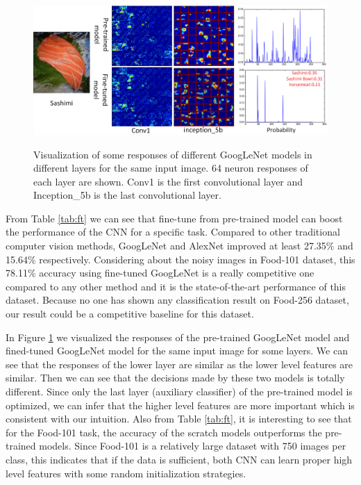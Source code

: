 \begin{figure}[htbp]
  \centering
  \includegraphics[scale=0.5]{fig/sashimi.png}\\
  \caption{Visualization of some responses of different GoogLeNet models in different layers for the same input image. 64 neuron responses of each layer are shown. Conv1 is the first convolutional layer and Inception\_5b is the last convolutional layer. }
   \label{fig:sashimi}
\end{figure}
From Table \ref{tab:ft} we can see that fine-tune from pre-trained model can boost the performance of the CNN for a specific task. Compared to other traditional computer vision methods, GoogLeNet and AlexNet improved at least 27.35\% and 15.64\% respectively. Considering about the noisy images in Food-101 dataset, this 78.11\% accuracy using fine-tuned GoogLeNet is a really competitive one compared to any other method and it is the state-of-the-art performance of this dataset. Because no one has shown any classification result on Food-256 dataset, our result could be a competitive baseline for this dataset.

In Figure \ref{fig:sashimi} we visualized the responses of the pre-trained GoogLeNet model and fined-tuned GoogLeNet model for the same input image for some layers. We can see that the responses of the lower layer are similar as the lower level features are similar. Then we can see that the decisions made by these two models is totally different. Since only the last layer (auxiliary classifier) of the pre-trained model is optimized, we can infer that the higher level features are more important which is consistent with our intuition. Also from Table \ref{tab:ft}, it is interesting to see that for the Food-101 task, the accuracy of  the scratch models outperforms the pre-trained models. Since Food-101 is a relatively large dataset with 750 images per class, this indicates that if the data is sufficient, both CNN can learn proper high level features with some random initialization strategies.

